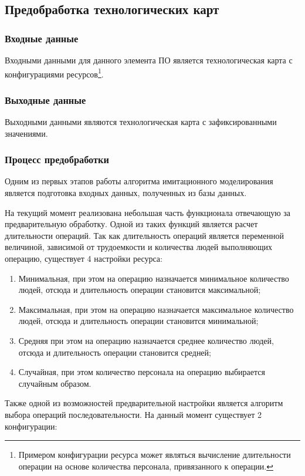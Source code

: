 \subsection{Предобработка технологических карт}

\subsubsection{Входные данные}
Входными данными для данного элемента ПО является технологическая карта с конфигурациями ресурсов\footnote{Примером конфигурации ресурса может являться вычисление длительности операции на основе количества персонала, привязанного к операции.}. 

\subsubsection{Выходные данные}
Выходными данными являются технологическая карта с зафиксированными значениями.

\subsubsection{Процесс предобработки}
Одним из первых этапов работы алгоритма имитационного моделирования является подготовка входных данных, полученных из базы данных. 

На текущий момент реализована небольшая часть функционала отвечающую за предварительную обработку. Одной из таких функций является расчет длительности операций. Так как длительность операций является переменной величиной, зависимой от трудоемкости и количества людей выполняющих операцию, существует 4 настройки ресурса:

\begin{enumerate}
    \item Минимальная, при этом на операцию назначается минимальное количество людей, отсюда и длительность операции становится максимальной;
    \item Максимальная, при этом на операцию назначается максимальное количество людей, отсюда и длительность операции становится минимальной;
    \item Средняя при этом на операцию назначается среднее количество людей, отсюда и длительность операции становится средней;
    \item Случайная, при этом количество персонала на операцию выбирается случайным образом. 
\end{enumerate}

Также одной из возможностей предварительной настройки является алгоритм выбора операций последовательности. На данный момент существует 2 конфигурации:

